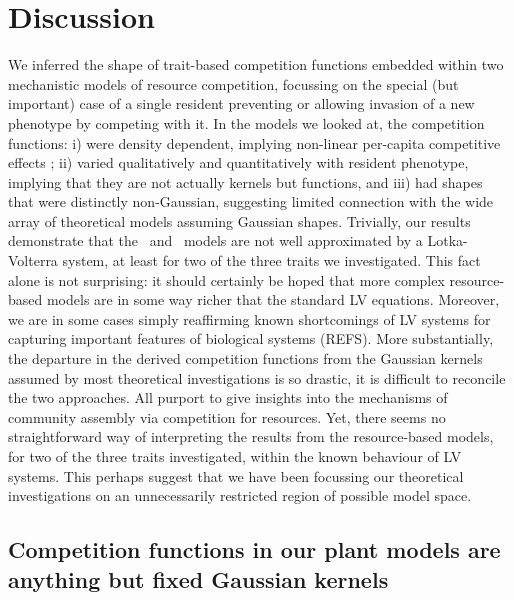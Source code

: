 \documentclass[a4paper,11pt]{article}
\begin{document}
\section{Discussion}

We inferred the shape of trait-based competition functions embedded within
two mechanistic models of resource competition, focussing on the special (but
important) case of a single resident preventing or allowing invasion of a new
phenotype by competing with it. In the models we looked at, the competition
functions: i) were density dependent, implying non-linear per-capita
competitive effects \citep{Abrams-1980}; ii) varied qualitatively and
quantitatively with resident phenotype, implying that they are not actually
kernels but functions, and iii) had shapes that were distinctly non-Gaussian,
suggesting limited connection with the wide array of theoretical models
assuming Gaussian shapes. Trivially, our results demonstrate that the \Rstar\
and \plant\  models are not well approximated by a Lotka-Volterra system, at
least for two of the three traits we investigated. This fact alone is not
surprising: it should certainly be hoped that more complex resource-based models
are in some way richer that the standard LV equations. Moreover, we are in
some cases simply reaffirming known shortcomings of LV systems for capturing
important features of biological systems (REFS). More substantially, the
departure in the derived competition functions from the Gaussian kernels
assumed by most theoretical investigations is so drastic, it is difficult to
reconcile the two approaches. All purport to give insights into the mechanisms
of community assembly via competition for resources. Yet, there seems no
straightforward way of interpreting the results from the resource-based
models, for two of the three traits investigated, within the known behaviour
of LV systems. This perhaps suggest that we have been focussing our
theoretical investigations on an unnecessarily restricted region of possible
model space.

\subsection{Competition functions in our plant models are anything but fixed 
Gaussian kernels}
\end{document}
